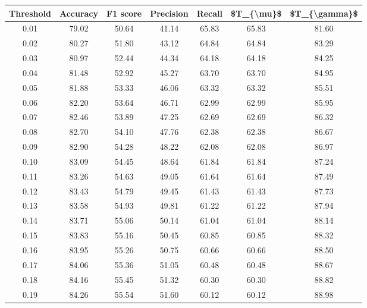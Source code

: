 \begin{tabular}{|c|c|c|c|c|c|c|}
\hline
 Threshold &  Accuracy &  F1 score &  Precision &  Recall &  \$T\_\{\textbackslash mu\}\$ &  \$T\_\{\textbackslash gamma\}\$ \\
\hline
      0.01 &     79.02 &     50.64 &      41.14 &   65.83 &      65.83 &         81.60 \\
      0.02 &     80.27 &     51.80 &      43.12 &   64.84 &      64.84 &         83.29 \\
      0.03 &     80.97 &     52.44 &      44.34 &   64.18 &      64.18 &         84.25 \\
      0.04 &     81.48 &     52.92 &      45.27 &   63.70 &      63.70 &         84.95 \\
      0.05 &     81.88 &     53.33 &      46.06 &   63.32 &      63.32 &         85.51 \\
      0.06 &     82.20 &     53.64 &      46.71 &   62.99 &      62.99 &         85.95 \\
      0.07 &     82.46 &     53.89 &      47.25 &   62.69 &      62.69 &         86.32 \\
      0.08 &     82.70 &     54.10 &      47.76 &   62.38 &      62.38 &         86.67 \\
      0.09 &     82.90 &     54.28 &      48.22 &   62.08 &      62.08 &         86.97 \\
      0.10 &     83.09 &     54.45 &      48.64 &   61.84 &      61.84 &         87.24 \\
      0.11 &     83.26 &     54.63 &      49.05 &   61.64 &      61.64 &         87.49 \\
      0.12 &     83.43 &     54.79 &      49.45 &   61.43 &      61.43 &         87.73 \\
      0.13 &     83.58 &     54.93 &      49.81 &   61.22 &      61.22 &         87.94 \\
      0.14 &     83.71 &     55.06 &      50.14 &   61.04 &      61.04 &         88.14 \\
      0.15 &     83.83 &     55.16 &      50.45 &   60.85 &      60.85 &         88.32 \\
      0.16 &     83.95 &     55.26 &      50.75 &   60.66 &      60.66 &         88.50 \\
      0.17 &     84.06 &     55.36 &      51.05 &   60.48 &      60.48 &         88.67 \\
      0.18 &     84.16 &     55.45 &      51.32 &   60.30 &      60.30 &         88.82 \\
      0.19 &     84.26 &     55.54 &      51.60 &   60.12 &      60.12 &         88.98 \\

\end{tabular}
